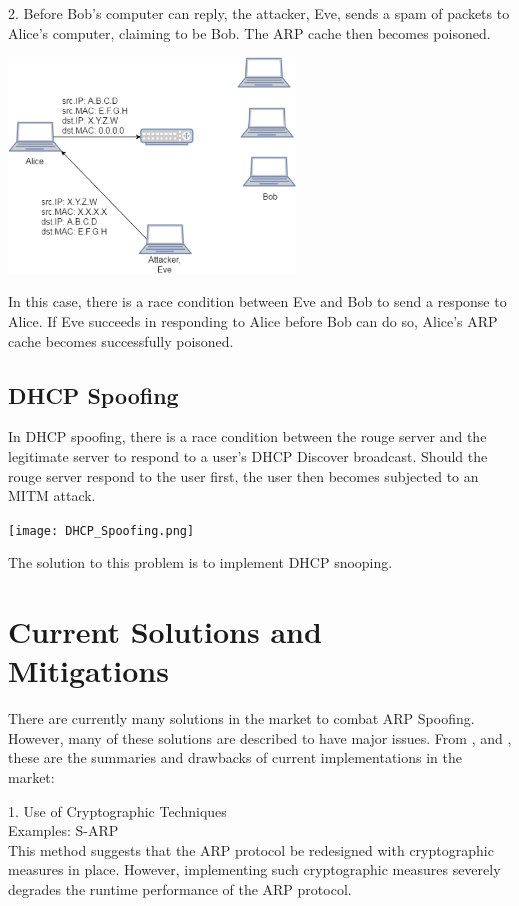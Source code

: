 \documentclass{acm_proc_article-sp}
\begin{document}
2. Before Bob's computer can reply, the attacker, Eve, sends a spam of packets to Alice's computer, claiming to be Bob. The ARP cache then becomes poisoned. 

\includegraphics[width=3in]{Poisoned_ARP.eps}

In this case, there is a race condition between Eve and Bob to send a response to Alice. If Eve succeeds in responding to Alice before Bob can do so, Alice's ARP cache becomes successfully poisoned. 

\subsection{DHCP Spoofing}
In DHCP spoofing, there is a race condition between the rouge server and the legitimate server to respond to a user's DHCP Discover broadcast. 
Should the rouge server respond to the user first, the user then becomes subjected to an MITM attack. 

\texttt{[image: DHCP\_Spoofing.png]}

The solution to this problem is to implement DHCP snooping. 

\section{Current Solutions and \\Mitigations}
There are currently many solutions in the market to combat ARP Spoofing. However, many of these solutions are described to have major issues. From \cite{vivek:arp}, \cite{navid:arp2} and \cite{goldendeep:arp3},  these are the summaries and drawbacks of current implementations in the market:

1. Use of Cryptographic Techniques \\
Examples: S-ARP \\
This method suggests that the ARP protocol be redesigned with cryptographic measures in place. However, implementing such cryptographic measures severely degrades the runtime performance of the ARP protocol. 
\end{document}
